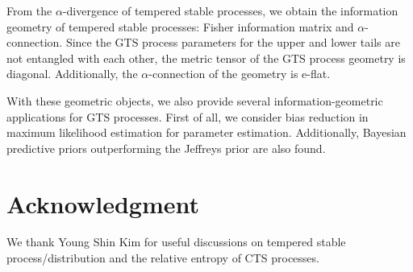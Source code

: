 \documentclass[preprint,11pt]{amsart}
\begin{document}
	From the $\alpha$-divergence of tempered stable processes, we obtain the information geometry of tempered stable processes: Fisher information matrix and $\alpha$-connection. Since the GTS process parameters for the upper and lower tails are not entangled with each other, the metric tensor of the GTS process geometry is diagonal. Additionally, the $\alpha$-connection of the geometry is e-flat. 

	With these geometric objects, we also provide several information-geometric applications for GTS processes. First of all, we consider bias reduction in maximum likelihood estimation for parameter estimation. Additionally, Bayesian predictive priors outperforming the Jeffreys prior are also found. 

\section*{Acknowledgment}
	We thank Young Shin Kim for useful discussions on tempered stable process/distribution and the relative entropy of CTS processes.
	


\end{document}

